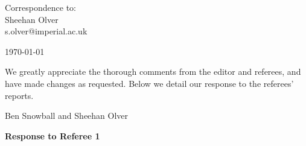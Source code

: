 \documentclass[10pt]{letter}
\begin{document}
\thispagestyle{empty}

\hfill
\begin{flushright}
Correspondence to: \\
Sheehan Olver \\
s.olver@imperial.ac.uk \\
\end{flushright}

\vspace{1em}
\hfill\today


We greatly appreciate the thorough comments from the editor and referees, and have made changes as requested. Below we detail our response to the referees' reports. 

Ben Snowball and Sheehan Olver

\bigskip 

\centerline{\textbf{Response to Referee 1}}
\end{document}

